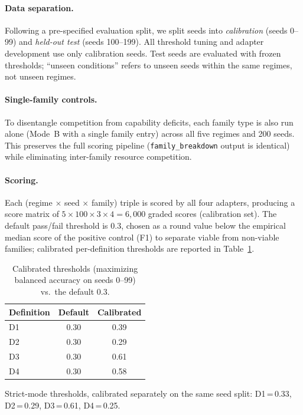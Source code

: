 \documentclass[letterpaper]{article}
\begin{document}
\paragraph{Data separation.}
Following a pre-specified evaluation split, we split seeds into
\emph{calibration} (seeds 0--99) and \emph{held-out test} (seeds 100--199).
All threshold tuning and adapter development use only calibration seeds.
Test seeds are evaluated with frozen thresholds; ``unseen conditions''
refers to unseen seeds within the same regimes, not unseen regimes.

\paragraph{Single-family controls.}
To disentangle competition from capability deficits, each family type is
also run alone (Mode~B with a single family entry) across all five
regimes and 200 seeds.  This preserves the full scoring pipeline
(\texttt{family\_breakdown} output is identical) while eliminating
inter-family resource competition.

\paragraph{Scoring.}
Each (regime $\times$ seed $\times$ family) triple is scored by all four
adapters, producing a score matrix of $5 \times 100 \times 3 \times 4 =
6{,}000$ graded scores (calibration set).
The default pass/fail threshold is 0.3, chosen as a round value below the
empirical median score of the positive control (F1) to separate viable
from non-viable families; calibrated per-definition thresholds are reported
in Table~\ref{tab:thresholds}.

\begin{table}[t]
\centering
\small
\caption{Calibrated thresholds (maximizing balanced accuracy on seeds 0--99)
vs.\ the default 0.3.}
\label{tab:thresholds}
\begin{tabular}{@{}lcc@{}}
\toprule
Definition & Default & Calibrated \\
\midrule
D1 & 0.30 & 0.39 \\
D2 & 0.30 & 0.29 \\
D3 & 0.30 & 0.61 \\
D4 & 0.30 & 0.58 \\
\bottomrule
\end{tabular}
\end{table}

Strict-mode thresholds, calibrated separately on the same seed split: D1\,=\,0.33, D2\,=\,0.29, D3\,=\,0.61, D4\,=\,0.25.
\end{document}
